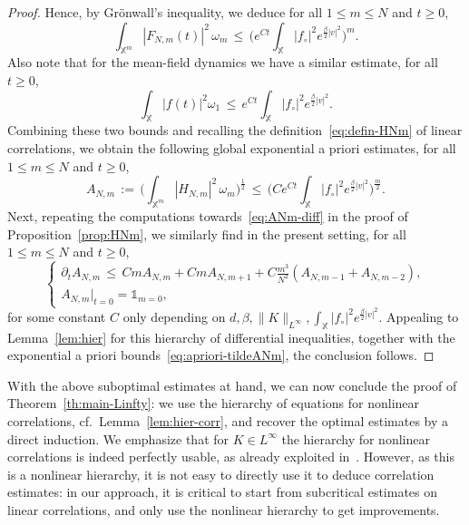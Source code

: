 \documentclass[a4paper,11pt,reqno,noindent]{amsart}
\theoremstyle{plain}
\theoremstyle{definition}
\numberwithin{equation}{section}
\newcommand{\Xd}{\mathbb X}
\begin{document}
\begin{proof}
Hence, by Gr\"onwall's inequality, we deduce for all $1\le m\le N$ and $t\ge0$,
\begin{equation*}
\int_{\Xd^m} |F_{N,m}(t)|^2\,\omega_{m}
\,\le\, \Big(e^{Ct}\int_{\Xd} |f_\circ|^2e^{\frac\beta2|v|^2}\Big)^m.
\end{equation*}
Also note that for the mean-field dynamics we have a similar estimate, for all $t\ge0$,
\begin{equation*}
\int_\Xd|f(t)|^2\omega_1
\,\le\,
e^{Ct}\int_\Xd|f_\circ|^2e^{\frac\beta2|v|^2}.
\end{equation*}
Combining these two bounds and recalling the definition~\eqref{eq:defin-HNm} of linear correlations, we obtain the following global exponential a priori estimates, for all $1\le m\le N$ and $t\ge0$,
\begin{equation}\label{eq:apriori-tildeANm}
A_{N,m}\,:=\,\Big(\int_{\Xd^m} |H_{N,m}|^2\,\omega_{m}\Big)^\frac12
\,\le\,\Big(Ce^{Ct}\int_\Xd|f_\circ|^2e^{\frac\beta2|v|^2}\Big)^\frac m2.
\end{equation}
Next, repeating the computations towards~\eqref{eq:ANm-diff} in the proof of Proposition~\ref{prop:HNm}, we similarly find in the present setting, for all $1\le m\le N$ and $t\ge0$,
\begin{equation*}
\left\{\begin{array}{l}
\partial_t A_{N,m}\,\le\,
Cm A_{N,m}
+Cm A_{N,m+1}
+C\frac{m^3}{N^2}( A_{N,m-1}+ A_{N,m-2}),\\
A_{N,m}|_{t=0}=\mathds1_{m=0},
\end{array}\right.
\end{equation*}
for some constant $C$ only depending on $d,\beta,\|K\|_{L^\infty},\int_\Xd|f_\circ|^2e^{\frac\beta2|v|^2}$.
Appealing to Lemma~\ref{lem:hier} for this hierarchy of differential inequalities, together with the exponential a priori bounds~\eqref{eq:apriori-tildeANm}, the conclusion follows.
\end{proof}

With the above suboptimal estimates at hand, we can now conclude the proof of Theorem~\ref{th:main-Linfty}: we use the hierarchy of equations for nonlinear correlations, cf.~Lemma~\ref{lem:hier-corr}, and recover the optimal estimates by a direct induction.
We emphasize that for $K\in L^\infty$ the hierarchy for nonlinear correlations is indeed perfectly usable, as already exploited in~\cite{Hess_Childs_2023}. However, as this is a nonlinear hierarchy, it is not easy to directly use it to deduce correlation estimates: in our approach, it is critical to start from subcritical estimates on linear correlations, and only use the nonlinear hierarchy to get improvements.
\end{document}
